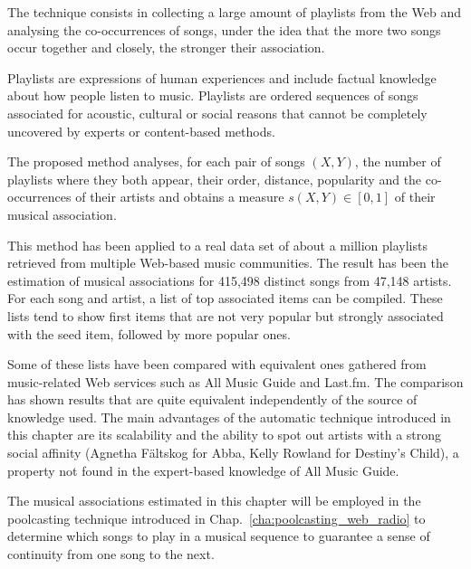 The technique consists in collecting a large amount of playlists from the Web and analysing the co-occurrences of songs, under the idea that the more two songs occur together and closely, the stronger their association.

Playlists are expressions of human experiences and include factual knowledge about how people listen to music. Playlists are ordered sequences of songs associated for acoustic, cultural or social reasons that cannot be completely uncovered by experts or content-based methods.

The proposed method analyses, for each pair of songs $(X,Y)$, the number of playlists where they both appear, their order, distance, popularity and the co-occurrences of their artists and obtains a measure $s(X,Y) \in [0,1]$ of their musical association.

This method has been applied to a real data set of about a million playlists retrieved from multiple Web-based music communities.
The result has been the estimation of musical associations for 415,498 distinct songs from 47,148 artists.
%
For each song and artist, a list of top associated items can be compiled.
These lists tend to show first items that are not very popular but strongly associated with the seed item, followed by more popular ones.

Some of these lists have been compared with equivalent ones gathered from music-related Web services such as All Music Guide and Last.fm.
The comparison has shown results that are quite equivalent independently of the source of knowledge used.
The main advantages of the automatic technique introduced in this chapter are its scalability and the ability to spot out artists with a strong social affinity (Agnetha F\"{a}ltskog for Abba, Kelly Rowland for Destiny's Child), a property not found in the expert-based knowledge of All Music Guide.

The musical associations estimated in this chapter will be employed in the poolcasting technique introduced in Chap.~\ref{cha:poolcasting_web_radio} to determine which songs to play in a musical sequence to guarantee a sense of continuity from one song to the next.


